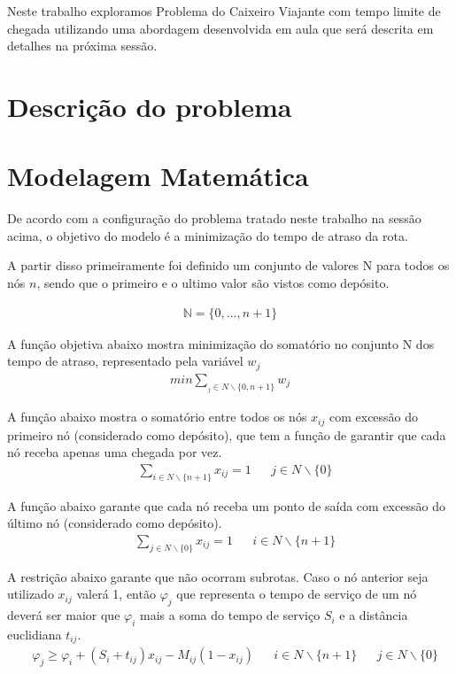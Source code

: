 \documentclass[12pt]{article}
\begin{document}
    Neste trabalho exploramos Problema do Caixeiro Viajante com tempo limite de chegada utilizando uma abordagem desenvolvida em aula que será descrita em detalhes na próxima sessão.



\section{Descrição do problema}
    
    


\section{Modelagem Matemática}

    De acordo com a configuração do problema tratado neste trabalho na sessão acima, o objetivo do modelo é a minimização do tempo de atraso da rota. 
    
    A partir disso primeiramente foi definido um conjunto de valores N para todos os nós $n$, sendo que o primeiro e o ultimo valor são vistos como depósito.
    
    \begin{align}
        \mathbb{N} = \{0, ..., n+1\}
    \end{align}
    
    A função objetiva abaixo mostra minimização do somatório no conjunto N dos tempo de atraso, representado pela variável $w_j$
    \begin{align}
        min        \sum_{_j\in N\backslash \{0,n+1\}} w_j \label{eq1}
    \end{align}
    
    A função abaixo mostra o somatório entre todos os nós $x_{ij}$ com excessão do primeiro nó (considerado como depósito), que tem a função de garantir que cada nó receba apenas uma chegada por vez.
    \begin{align}
      & \sum_{i\in N\backslash \{n+1\}} x_{ij} = 1                         &    & j\in N\backslash \{0\}
    \end{align}
    
    A função abaixo garante que cada nó receba um ponto de saída com excessão do último nó (considerado como depósito).
    \begin{align}
      & \sum_{j\in N\backslash \{0\}} x_{ij} = 1                           &               & i\in N\backslash \{n+1\}  
    \end{align}
    
    A restrição abaixo garante que não ocorram subrotas. Caso o nó anterior seja utilizado $x_{ij}$ valerá 1, então $\varphi_j$ que representa o tempo de serviço de um nó deverá ser maior que $\varphi_i$ mais a soma do tempo de serviço $S_i$ e a distância euclidiana $t_{ij}$.
    \begin{align}
      & \varphi_j \geq \varphi_i + (S_i + t_{ij})x_{ij} - M_{ij}(1-x_{ij}) & \label{eq3}    & i\in N\backslash \{n+1\}   &  & j\in N\backslash \{0\} 
    \end{align}
    
\end{document}
